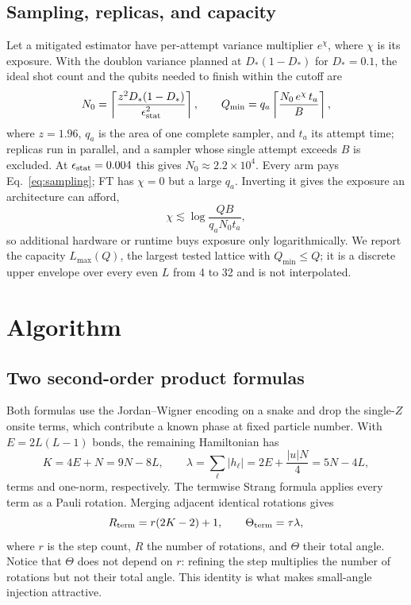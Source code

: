\documentclass[11pt]{article}
\newcommand{\eps}{\epsilon}
\begin{document}
\subsection{Sampling, replicas, and capacity}
Let a mitigated estimator have per-attempt variance multiplier $e^{\chi}$,
where $\chi$ is its exposure. With the doublon variance planned at
$D_*(1-D_*)$ for $D_*=0.1$, the ideal shot count and the qubits needed to
finish within the cutoff are
\begin{equation}\label{eq:sampling}
 N_0=\left\lceil\frac{z^2D_*(1-D_*)}{\eps_{\rm stat}^2}\right\rceil,\qquad
 Q_{\min}=q_a\left\lceil\frac{N_0\,e^{\chi}\,t_a}{B}\right\rceil,
\end{equation}
where $z=1.96$, $q_a$ is the area of one complete sampler, and $t_a$ its
attempt time; replicas run in parallel, and a sampler whose single attempt
exceeds $B$ is excluded. At $\eps_{\rm stat}=0.004$ this gives $N_0\approx2.2\times10^4$.
Every arm pays Eq.~\eqref{eq:sampling}; FT has $\chi=0$ but a large $q_a$.
Inverting it gives the exposure an architecture can afford,
\begin{equation}\label{eq:wall}
 \chi\lesssim\log\frac{QB}{q_aN_0t_a},
\end{equation}
so additional hardware or runtime buys exposure only logarithmically. We report
the capacity $L_{\max}(Q)$, the largest tested lattice with $Q_{\min}\leq Q$;
it is a discrete upper envelope over every even $L$ from 4 to 32 and is not
interpolated.

\section{Algorithm}\label{sec:algorithm}
\subsection{Two second-order product formulas}
Both formulas use the Jordan--Wigner encoding on a snake and drop the
single-$Z$ onsite terms, which contribute a known phase at fixed particle
number. With $E=2L(L-1)$ bonds, the remaining Hamiltonian has
\begin{equation}\label{eq:terms}
 K=4E+N=9N-8L,\qquad
 \lambda=\sum_\ell|h_\ell|=2E+\frac{|u|N}{4}=5N-4L,
\end{equation}
terms and one-norm, respectively. The termwise Strang formula applies every
term as a Pauli rotation. Merging adjacent identical rotations gives
\begin{equation}\label{eq:termwise}
 R_{\rm term}=r(2K-2)+1,\qquad \Theta_{\rm term}=\tau\lambda,
\end{equation}
where $r$ is the step count, $R$ the number of rotations, and $\Theta$ their
total angle. Notice that $\Theta$ does not depend on $r$: refining the step
multiplies the number of rotations but not their total angle. This identity
is what makes small-angle injection attractive.
\end{document}
